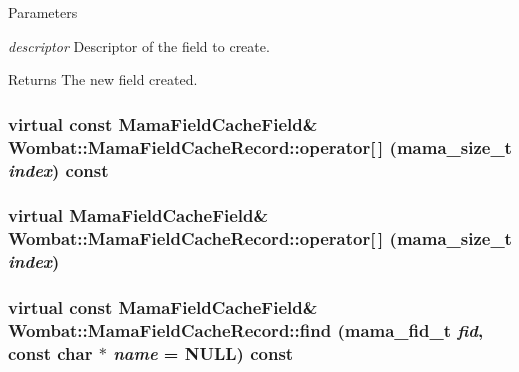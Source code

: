 \begin{DoxyParams}{Parameters}
\item[{\em descriptor}]Descriptor of the field to create. \end{DoxyParams}
\begin{DoxyReturn}{Returns}
The new field created. 
\end{DoxyReturn}
\hypertarget{classWombat_1_1MamaFieldCacheRecord_a9f4ac2fab76927ae0895eb2c2b6cfdb3}{
\subsubsection[{operator[]}]{\setlength{\rightskip}{0pt plus 5cm}virtual const {\bf MamaFieldCacheField}\& Wombat::MamaFieldCacheRecord::operator\mbox{[}$\,$\mbox{]} ({\bf mama\_\-size\_\-t} {\em index}) const}}
\label{classWombat_1_1MamaFieldCacheRecord_a9f4ac2fab76927ae0895eb2c2b6cfdb3}
\hypertarget{classWombat_1_1MamaFieldCacheRecord_ad4a6754e503f14e6bc28690754fb8f38}{
\subsubsection[{operator[]}]{\setlength{\rightskip}{0pt plus 5cm}virtual {\bf MamaFieldCacheField}\& Wombat::MamaFieldCacheRecord::operator\mbox{[}$\,$\mbox{]} ({\bf mama\_\-size\_\-t} {\em index})}}
\label{classWombat_1_1MamaFieldCacheRecord_ad4a6754e503f14e6bc28690754fb8f38}
\hypertarget{classWombat_1_1MamaFieldCacheRecord_a48049a7dd4f0302cb9f8ef406a1e493f}{
\subsubsection[{find}]{\setlength{\rightskip}{0pt plus 5cm}virtual const {\bf MamaFieldCacheField}\& Wombat::MamaFieldCacheRecord::find (mama\_\-fid\_\-t {\em fid}, \/  const char $\ast$ {\em name} = {\ttfamily NULL}) const}}
\label{classWombat_1_1MamaFieldCacheRecord_a48049a7dd4f0302cb9f8ef406a1e493f}


